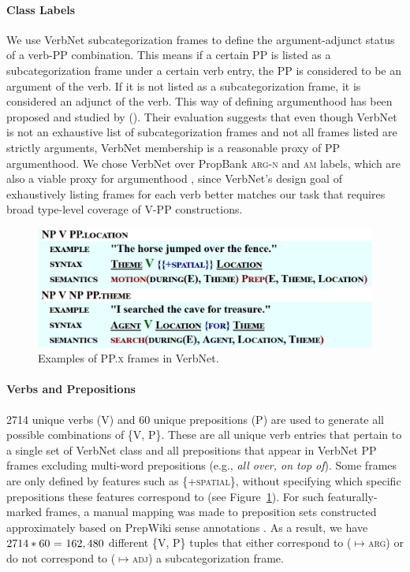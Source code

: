 \documentclass[letterpaper]{article} %
\begin{document}
\paragraph{Class Labels} We use VerbNet subcategorization frames to define the argument-adjunct status of a verb-PP combination. This means if a certain PP is listed as a subcategorization frame under a certain verb entry, the PP is considered to be an argument of the verb. If it is not listed as a subcategorization frame, it is considered an adjunct of the verb. This way of defining argumenthood has been proposed and studied by \citeauthor{mcconville2008evaluating} (\citeyear{mcconville2008evaluating}). Their evaluation suggests that even though VerbNet is not an exhaustive list of subcategorization frames and not all frames listed are strictly arguments, VerbNet membership is a reasonable proxy of PP argumenthood. We chose VerbNet over PropBank \textsc{arg-n} and \textsc{am} labels, which are also a viable proxy for argumenthood \cite{abend2010fully}, since VerbNet's design goal of exhaustively listing frames for each verb better matches our task that requires broad type-level coverage of V-PP constructions. %

\begin{figure}[h]
\centering
	\includegraphics[width=0.9\linewidth]{ppframes}
	\caption{Examples of \textsc{PP.x} frames in VerbNet.}
	\label{fig:ppframes}
\end{figure}

\paragraph{Verbs and Prepositions} 2714 unique verbs (V) and 60 unique prepositions (P) are used to generate all possible combinations of \{\textsc{V, P}\}. These are all unique verb entries that pertain to a single set of VerbNet class and all prepositions that appear in VerbNet PP frames excluding multi-word prepositions (e.g., \textit{all over, on top of}). Some frames are only defined by features such as \textsc{\{+spatial\}}, without specifying which specific prepositions these features correspond to (see Figure~\ref{fig:ppframes}). For such featurally-marked frames, a manual mapping was made to preposition sets constructed approximately based on PrepWiki sense annotations \cite{schneider2015hierarchy}. As a result, we have $2714*60\textnormal{ = }162,480$ different \textsc{\{V, P\}} tuples that either correspond to ($\mapsto$\textsc{arg}) or do not correspond to ($\mapsto$\textsc{adj}) a subcategorization frame.
\end{document}
